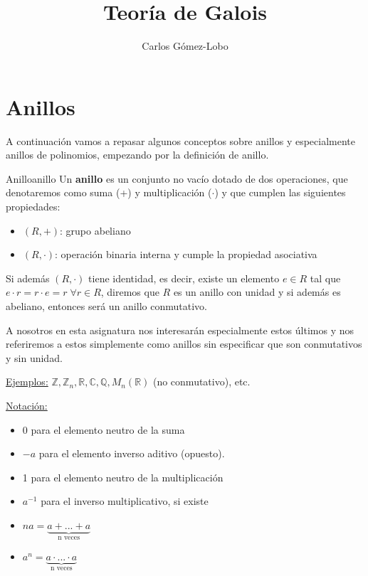 \documentclass[10pt, a4paper]{article}
\newcommand{\R}{\mathbb{R}}
\newcommand{\Z}{\mathbb{Z}}
\newcommand{\C}{\mathbb{C}}
\newcommand{\Q}{\mathbb{Q}}
\begin{document}
\title{Teoría de Galois}
\author{Carlos Gómez-Lobo}
\date{}
\maketitle

\section{Anillos}

A continuación vamos a repasar algunos conceptos sobre anillos y especialmente anillos de polinomios, empezando por la definición de anillo.

\begin{definition}{Anillo}{anillo}
Un \textbf{anillo} es un conjunto no vacío dotado de dos operaciones, que denotaremos como suma (+) y multiplicación ($\cdot$) y que cumplen las siguientes propiedades:
\begin{itemize}
	\item $(R, +)$: grupo abeliano
	\item $(R, \cdot)$: operación binaria interna y cumple la propiedad asociativa
\end{itemize}
Si además $(R, \cdot)$ tiene identidad, es decir, existe un elemento $e \in R$ tal que $e \cdot r = r \cdot e = r \; \forall r \in R$, diremos que $R$ es un anillo con unidad y si además es abeliano, entonces será un anillo conmutativo.
\end{definition}

A nosotros en esta asignatura nos interesarán especialmente estos últimos y nos referiremos a estos simplemente como anillos sin especificar que son conmutativos y sin unidad.

\vspace{3mm}

\underline{Ejemplos:} $\Z, \Z_n, \R, \C, \Q, M_n(\R)$ (no conmutativo), etc.

\vspace{3mm}

\underline{Notación:} \begin{itemize}
	\item 0 para el elemento neutro de la suma
	\item $-a$ para el elemento inverso aditivo (opuesto).
	\item 1 para el elemento neutro de la multiplicación
	\item $a^{-1}$ para el inverso multiplicativo, si existe
	\item $na = \underbrace{a + ... + a}_{\text{n veces}}$
	
	\vspace{-3mm}
	
	\item $a^n = \underbrace{a \cdot ... \cdot a}_{\text{n veces}}$
\end{itemize}
\end{document}
